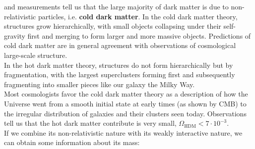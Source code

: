 \documentclass[10.75pt,a4paper,openright,bottom=2cm]{article}
\begin{document}
and measurements tell us that the large majority of dark matter is due to non-relativistic particles, i.e. \textbf{cold dark matter}. In the cold dark matter theory, structures grow hierarchically, with small objects collapsing under their self-gravity first and merging to form larger and more massive objects. Predictions of cold dark matter are in general agreement with observations of cosmological large-scale structure.\\
In the hot dark matter theory, structures do not form hierarchically but by fragmentation, with the largest superclusters forming first and subsequently fragmenting into smaller pieces like our galaxy the Milky Way.\\
Most cosmologists favor the cold dark matter theory as a description of how the Universe went from a smooth initial state at early times (as shown by CMB) to the irregular distribution of galaxies and their clusters seen today. Observations tell us that the hot dark matter contribute is very small, $\Omega_{\text{HDM}}<7\cdot10^{-3}$.\\
If we combine its non-relativistic nature with its weakly interactive nature, we can obtain some information about its mass:
\end{document}
